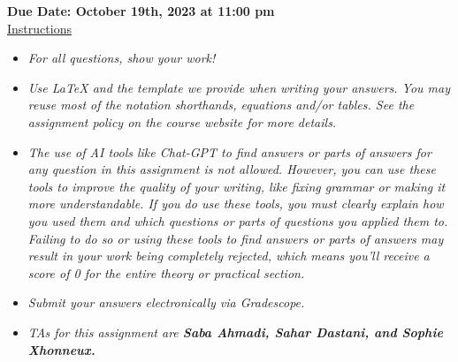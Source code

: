 \documentclass[12pt]{article}
\theoremstyle{definition}
\begin{document}
\fancyhead{}
\fancyfoot{}


\vspace{1cm}

\shorthandoff{:}
{\textbf{Due Date: October 19th, 2023 at 11:00 pm}}\\


\vspace{-0.5cm}
\underline{Instructions}%
\renewcommand{\labelitemi}{\textbullet}

\begin{itemize}
\item \emph{For all questions, show your work!}
\item \emph{Use LaTeX and the template we provide when writing your answers.
You may reuse most of the notation shorthands, equations and/or tables.
See the assignment policy on the course website for more details.}
\item \emph{The use of AI tools like Chat-GPT to find answers or parts of answers for any question in this assignment is not allowed. However, you can use these tools to improve the quality of your writing, like fixing grammar or making it more understandable. If you do use these tools, you must clearly explain how you used them and which questions or parts of questions you applied them to. Failing to do so or using these tools to find answers or parts of answers may result in your work being completely rejected, which means you'll receive a score of 0 for the entire theory or practical section.}
\item \emph{Submit your answers electronically via Gradescope.}
\item \emph{TAs for this assignment are \textbf{Saba Ahmadi, Sahar Dastani, and Sophie Xhonneux.}}
\end{itemize}

\vspace{0.2cm}
\end{document}
